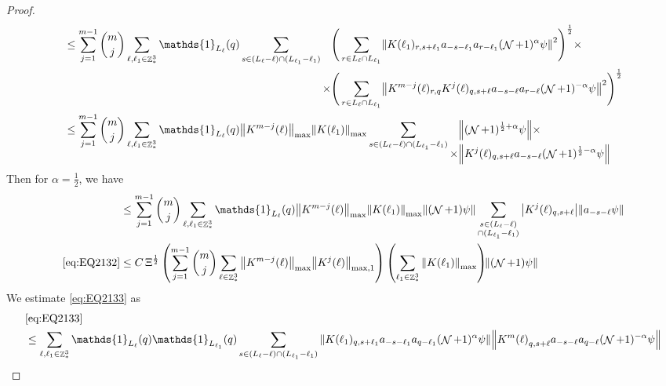 \documentclass[sn-mathphys, Numbered ,a4paper]{sn-jnl}%
\DeclareMathOperator{\Z}{\mathbb{Z}}
\DeclareMathOperator{\NN}{\mathcal{N}}
\newcommand{\half}{\frac{1}{2}}
\theoremstyle{plain}
\theoremstyle{definition}
\theoremstyle{remark}
\theoremstyle{plain}
\theoremstyle{definition}
\theoremstyle{remark}
\begin{document}
\begin{proof}
\begin{align}
    &\leq \sum\limits_{j=1}^{m-1} {{m}\choose j} \sum\limits_{\ell, \ell_1\in \Z^3_*} \mathds{1}_{L_{\ell}}(q) \sum\limits_{ s \in (L_{\ell}-\ell) \cap (L_{\ell_1}-\ell_1)}   \begin{aligned}[t] \Bigg(\sum\limits_{r\in L_{\ell} \cap L_{\ell_1}} &\norm{ K(\ell_1)_{r,s+\ell_1}a_{-s-\ell_1} a_{r-\ell_1} (\NN+1)^{\alpha}\psi}^2\Bigg)^\half\nonumber \times \\ \times\Bigg(  \sum\limits_{ r\in L_{\ell} \cap L_{\ell_1}}&\norm{ K^{m-j}(\ell)_{r,q} K^{j}(\ell)_{q,s+\ell} a_{-s-\ell}a_{r-\ell} (\NN+1)^{-\alpha} \psi }^2\Bigg)^\half\end{aligned} \nonumber\\
    &\leq \sum\limits_{j=1}^{m-1} {{m}\choose j} \sum\limits_{\ell, \ell_1\in \Z^3_*} \mathds{1}_{L_{\ell}}(q) \norm{K^{m-j}(\ell)}_{\mathrm{max}} \norm{ K(\ell_1)}_{\mathrm{max}} \sum\limits_{ s \in (L_{\ell}-\ell) \cap (L_{\ell_1}-\ell_1)} \begin{aligned}[t] &\norm{(\NN+1)^{\half+\alpha}\psi}\nonumber \times \\ \times&\norm{  K^{j}(\ell)_{q,s+\ell}  a_{-s-\ell} (\NN+1)^{\half-\alpha} \psi }\end{aligned} \nonumber
\end{align} 
Then for $\alpha = \half$, we have
\begin{align}
	&\leq \sum\limits_{j=1}^{m-1} {{m}\choose j} \sum\limits_{\ell, \ell_1\in \Z^3_*} \mathds{1}_{L_{\ell}}(q) \norm{K^{m-j}(\ell)}_{\mathrm{max}} \norm{ K(\ell_1)}_{\mathrm{max}} \norm{(\NN+1)\psi}\sum\limits_{ \substack{s \in (L_{\ell}-\ell) \\ \cap (L_{\ell_1}-\ell_1)}} \abs{K^{j}(\ell)_{q,s+\ell}} \norm{ a_{-s-\ell}  \psi }\nonumber\\
	\eqref{eq:EQ2132} &\leq  C \, \Xi^\half \left(  \sum\limits_{j=1}^{m-1} {{m}\choose j} \sum\limits_{\ell \in \Z^3_*} \norm{K^{m-j}(\ell)}_{\mathrm{max}} \norm{ K^{j}(\ell)}_{\mathrm{max,1}}\right) \left( \sum\limits_{ \ell_1\in \Z^3_*}\norm{ K(\ell_1) }_{\mathrm{max}} \right)\!\! \norm{(\NN+1) \psi }\label{eq:estEQ2132}
\end{align}
We estimate \eqref{eq:EQ2133} as
\begin{align}
    &\eqref{eq:EQ2133}\nonumber\\
    &\leq \sum\limits_{\ell, \ell_1\in \Z^3_*} \mathds{1}_{L_{\ell}}(q) \mathds{1}_{L_{\ell_1}}(q) \sum\limits_{ s \in (L_{\ell}-\ell) \cap (L_{\ell_1}-\ell_1)} \norm{K(\ell_1)_{q,s+\ell_1} a_{-s-\ell_1} a_{q-\ell_1}  (\NN+1)^{\alpha}\psi}\norm{ K^m{(\ell)}_{q,s+\ell}  a_{-s-\ell} a_{q-\ell} (\NN+1)^{-\alpha} \psi } \nonumber\\

\end{align}
\end{proof}
\end{document}
